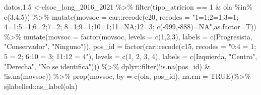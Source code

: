 \documentclass[
  12pt,
]{book}
\newenvironment{Shaded}{\begin{snugshade}}{\end{snugshade}}
\newcommand{\AttributeTok}[1]{\textcolor[rgb]{0.77,0.63,0.00}{#1}}
\newcommand{\ConstantTok}[1]{\textcolor[rgb]{0.00,0.00,0.00}{#1}}
\newcommand{\DecValTok}[1]{\textcolor[rgb]{0.00,0.00,0.81}{#1}}
\newcommand{\FloatTok}[1]{\textcolor[rgb]{0.00,0.00,0.81}{#1}}
\newcommand{\FunctionTok}[1]{\textcolor[rgb]{0.00,0.00,0.00}{#1}}
\newcommand{\NormalTok}[1]{#1}
\newcommand{\OtherTok}[1]{\textcolor[rgb]{0.56,0.35,0.01}{#1}}
\newcommand{\SpecialCharTok}[1]{\textcolor[rgb]{0.00,0.00,0.00}{#1}}
\newcommand{\StringTok}[1]{\textcolor[rgb]{0.31,0.60,0.02}{#1}}
\begin{document}
\begin{Shaded}
\begin{Highlighting}[]
\NormalTok{datos.}\FloatTok{1.5} \OtherTok{\textless{}{-}}\NormalTok{elsoc\_long\_2016\_2021 }\SpecialCharTok{\%\textgreater{}\%}
  \FunctionTok{filter}\NormalTok{(tipo\_atricion }\SpecialCharTok{==} \DecValTok{1} \SpecialCharTok{\&}\NormalTok{ ola }\SpecialCharTok{\%in\%} \FunctionTok{c}\NormalTok{(}\DecValTok{3}\NormalTok{,}\DecValTok{4}\NormalTok{,}\DecValTok{5}\NormalTok{)) }\SpecialCharTok{\%\textgreater{}\%}
 \FunctionTok{mutate}\NormalTok{(}\AttributeTok{movsoc =}\NormalTok{ car}\SpecialCharTok{::}\FunctionTok{recode}\NormalTok{(c20, }\AttributeTok{recodes =} \StringTok{"1=\textquotesingle{}1\textquotesingle{};2=\textquotesingle{}1\textquotesingle{};3=\textquotesingle{}1\textquotesingle{};}
\StringTok{                                          4=\textquotesingle{}1\textquotesingle{};5=\textquotesingle{}1\textquotesingle{};6=\textquotesingle{}2\textquotesingle{};7=\textquotesingle{}2\textquotesingle{};}
\StringTok{                                          8=\textquotesingle{}1\textquotesingle{};9=\textquotesingle{}1\textquotesingle{};10=\textquotesingle{}1\textquotesingle{};11=NA;12=\textquotesingle{}3\textquotesingle{};}
\StringTok{                                          c({-}999,{-}888)=NA"}\NormalTok{,}\AttributeTok{as.factor=}\NormalTok{T)) }\SpecialCharTok{\%\textgreater{}\%} 
   \FunctionTok{mutate}\NormalTok{(}\AttributeTok{movsoc =} \FunctionTok{factor}\NormalTok{(movsoc, }\AttributeTok{levels =} \FunctionTok{c}\NormalTok{(}\DecValTok{1}\NormalTok{,}\DecValTok{2}\NormalTok{,}\DecValTok{3}\NormalTok{),}
                         \AttributeTok{labels =} \FunctionTok{c}\NormalTok{(}\StringTok{\textquotesingle{}Progresista\textquotesingle{}}\NormalTok{, }\StringTok{"Conservador"}\NormalTok{, }\StringTok{"Ninguno"}\NormalTok{)),}
          \AttributeTok{pos\_id =} \FunctionTok{factor}\NormalTok{(car}\SpecialCharTok{::}\FunctionTok{recode}\NormalTok{(c15, }\AttributeTok{recodes =} \StringTok{"0:4 = 1; 5 = 2; 6:10 = 3; 11:12 = 4"}\NormalTok{),}
                       \AttributeTok{levels =} \FunctionTok{c}\NormalTok{(}\DecValTok{1}\NormalTok{, }\DecValTok{2}\NormalTok{, }\DecValTok{3}\NormalTok{, }\DecValTok{4}\NormalTok{),}
                       \AttributeTok{labels =} \FunctionTok{c}\NormalTok{(}\StringTok{\textquotesingle{}Izquierda\textquotesingle{}}\NormalTok{, }\StringTok{"Centro"}\NormalTok{, }\StringTok{"Derecha"}\NormalTok{, }\StringTok{"No se identifica"}\NormalTok{))) }\SpecialCharTok{\%\textgreater{}\%}
\NormalTok{  dplyr}\SpecialCharTok{::}\FunctionTok{filter}\NormalTok{(}\SpecialCharTok{!}\FunctionTok{is.na}\NormalTok{(pos\_id) }\SpecialCharTok{\&} \SpecialCharTok{!}\FunctionTok{is.na}\NormalTok{(movsoc)) }\SpecialCharTok{\%\textgreater{}\%}
  \FunctionTok{prop}\NormalTok{(movsoc, }\AttributeTok{by  =} \FunctionTok{c}\NormalTok{(ola, pos\_id), }\AttributeTok{na.rm =} \ConstantTok{TRUE}\NormalTok{)}\SpecialCharTok{\%\textgreater{}\%} 
\NormalTok{  sjlabelled}\SpecialCharTok{::}\FunctionTok{as\_label}\NormalTok{(ola)}


\end{Highlighting}
\end{Shaded}
\end{document}
